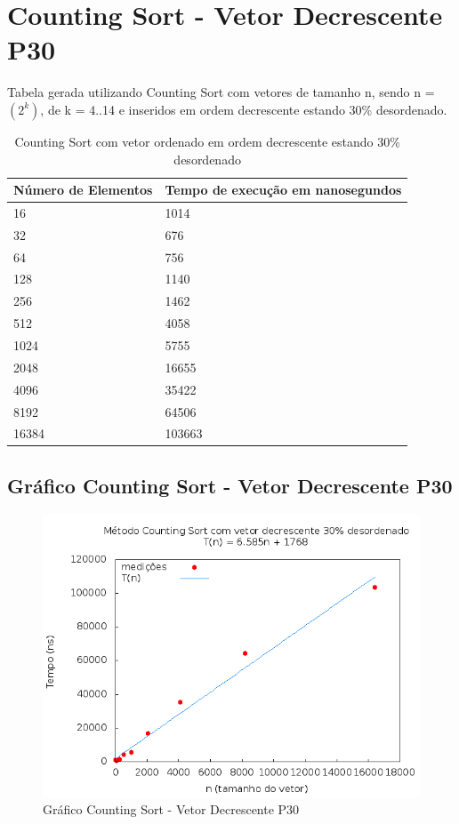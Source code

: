 \documentclass[12pt,a4paper,twoside]{report}
\begin{document}
\section{Counting Sort - Vetor Decrescente P30}
Tabela gerada utilizando Counting Sort com vetores de tamanho n, sendo n = $(2^k)$, de k = 4..14 e inseridos em ordem decrescente estando 30\% desordenado.
\begin{table}[H]
\centering
\caption{Counting Sort com vetor ordenado em ordem decrescente estando 30\% desordenado}
\label{my-label}
\begin{tabular}{|l|l|}
\hline
\multicolumn{1}{|c|}{\textbf{Número de Elementos}} & \multicolumn{1}{c|}{\textbf{Tempo de execução em nanosegundos}} \\ \hline
16 & 1014 \\ \hline
32 & 676 \\ \hline
64 & 756 \\ \hline
128 & 1140 \\ \hline
256 & 1462 \\ \hline
512 & 4058 \\ \hline
1024 & 5755 \\ \hline
2048 & 16655 \\ \hline
4096 & 35422 \\ \hline
8192 & 64506 \\ \hline
16384 & 103663 \\ \hline
\end{tabular}
\end{table}

\subsection{Gráfico Counting Sort - Vetor Decrescente P30}
\begin{figure}[H]
    \centering
    \includegraphics[width=0.7\linewidth]{graficos/CountingSort/vIntDecrescenteP30/vIntDecrescenteP30.png}
  \caption{Gráfico Counting Sort - Vetor Decrescente P30}
\end{figure}
\end{document}
